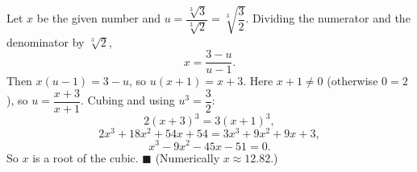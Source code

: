 Let $x$ be the given number and $u=\dfrac{\sqrt[3]3}{\sqrt[3]2}=\sqrt[3]{\dfrac32}$. Dividing the numerator and the denominator by $\sqrt[3]2$,
\[x=\dfrac{3-u}{u-1}.\]
Then $x(u-1)=3-u$, so $u(x+1)=x+3$. Here $x+1\ne0$ (otherwise $0=2$), so $u=\dfrac{x+3}{x+1}$. Cubing and using $u^3=\dfrac32$:
\[2(x+3)^3=3(x+1)^3,\]
\[2x^3+18x^2+54x+54=3x^3+9x^2+9x+3,\]
\[x^3-9x^2-45x-51=0.\]
So $x$ is a root of the cubic. $\blacksquare$ (Numerically $x\approx12.82$.)
